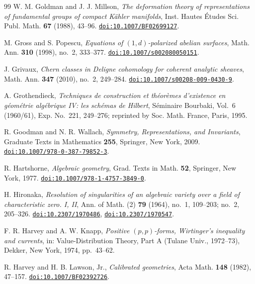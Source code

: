 \begin{thebibliography}{99}
W. M. Goldman and J. J. Millson,
\emph{The deformation theory of representations of fundamental groups of
compact K\"ahler manifolds},
Inst. Hautes \'Etudes Sci. Publ. Math. \textbf{67} (1988), 43--96.
\href{https://doi.org/10.1007/BF02699127}{\texttt{doi:10.1007/BF02699127}}.

M. Gross and S. Popescu,
\emph{Equations of $(1,d)$-polarized abelian surfaces},
Math. Ann. \textbf{310} (1998), no.~2, 333--377.
\href{https://doi.org/10.1007/s002080050151}{\texttt{doi:10.1007/s002080050151}}.

J. Grivaux,
\emph{Chern classes in Deligne cohomology for coherent analytic sheaves},
Math. Ann. \textbf{347} (2010), no.~2, 249--284.
\href{https://doi.org/10.1007/s00208-009-0430-9}{\texttt{doi:10.1007/s00208-009-0430-9}}.

A. Grothendieck,
\emph{Techniques de construction et th\'eor\`emes d'existence en g\'eom\'etrie
alg\'ebrique IV: les sch\'emas de Hilbert},
S\'eminaire Bourbaki, Vol.~6 (1960/61), Exp. No.~221, 249--276;
reprinted by Soc. Math. France, Paris, 1995.

R. Goodman and N. R. Wallach,
\emph{Symmetry, Representations, and Invariants},
Graduate Texts in Mathematics \textbf{255}, Springer, New York, 2009.
\href{https://doi.org/10.1007/978-0-387-79852-3}{\texttt{doi:10.1007/978-0-387-79852-3}}.

R. Hartshorne,
\emph{Algebraic geometry},
Grad. Texts in Math. \textbf{52}, Springer, New York, 1977.
\href{https://doi.org/10.1007/978-1-4757-3849-0}{\texttt{doi:10.1007/978-1-4757-3849-0}}.

H. Hironaka,
\emph{Resolution of singularities of an algebraic variety over a field of
characteristic zero. I, II},
Ann. of Math. (2) \textbf{79} (1964), no.~1, 109--203; no.~2, 205--326.
\href{https://doi.org/10.2307/1970486}{\texttt{doi:10.2307/1970486}},
\href{https://doi.org/10.2307/1970547}{\texttt{doi:10.2307/1970547}}.

F. R. Harvey and A. W. Knapp,
\emph{Positive $(p,p)$-forms, Wirtinger's inequality and currents},
in: Value-Distribution Theory, Part A (Tulane Univ., 1972--73),
Dekker, New York, 1974, pp.~43--62.

R. Harvey and H. B. Lawson, Jr.,
\emph{Calibrated geometries},
Acta Math. \textbf{148} (1982), 47--157.
\href{https://doi.org/10.1007/BF02392726}{\texttt{doi:10.1007/BF02392726}}.


\end{thebibliography}
